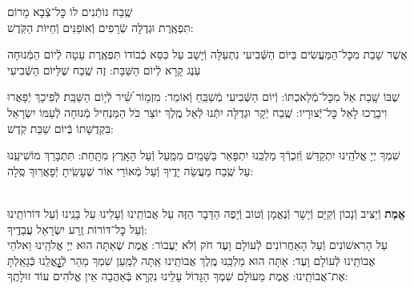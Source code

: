 \documentclass[twoside, openany, parskip=half, 11pt]{book}
\begin{document}
\shatz שֶֽׁבַח נוֹתְֿנִים לוֹ כׇּל־צְֿבָא מָרוֹם \\
תִּפְאֶֽרֶת וּגְדֻלָּה שְֿׂרָפִים וְֿאוֹפַנִּים וְֿחַיּוֹת הַקֹּֽדֶשׁ:

\chazzan {}
 אֲשֶׁר שָׁבַת מִכׇּל־הַמַּעֲשִׂים בַּיּוֹם הַשְּֿׁבִיעִי נִתְעַלָּה וְֿיָשַׁב עַל כִּסֵּא כְֿבוֹדוֹ תִּפְאֶֽרֶת עָטָה לְֿיוֹם הַמְּֿנוּחָה עֹֽנֶג קָרָא לְֿיוֹם הַשַּׁבָּת: זֶה שֶֽׁבַח שֶׁלַּיּוֹם הַשְּֿׁבִיעִי

\kahal
 שֶׁבּוֹ שָֽׁבַת אֵל מִכׇּל־מְֿלַאכְתּוֹ: וְֿיוֹם הַשְּֿׁבִיעִי מְֿשַׁבֵּֽחַ וְֿאוֹמֵר:
%
 מִזְמ֥וֹר שִׁ֝֗יר לְֿי֥וֹם הַשַּׁבָּֽת׃ לְֿפִיכָךְ יְֿפָאֲרוּ וִיבָרֲכוּ לָאֵל כׇּל־יְֿצוּרָיו: שֶֽׁבַח יְֿקָר וּגְדֻלָּה יִתְּֿנוּ לְֿאֵל מֶֽלֶךְ יוֹצֵר כֹּל הַמַּנְחִיל מְֿנוּחָה לְֿעַמּוֹ יִשְׂרָאֵל בִּקְדֻשָּׁתוֹ בְּֿיוֹם שַׁבַּת קֹֽדֶשׁ:

 \chazzan
 שִׁמְךָ יְיָ אֱלֹהֵֽינוּ יִתְקַדַּשׁ וְֿזִכְרְֿךָ מַלְכֵּֽנוּ יִתְפָּאַר בַּשָּׁמַֽיִם מִמַּֽעַל וְֿעַל הָאָֽרֶץ מִתָּֽחַת:
 תִּתְבָּרַךְ מוֹשִׁיעֵֽנוּ עַל שֶֽׁבַח מַעֲשֵׂה יָדֶֽיךָ וְֿעַל מְֿאוֹרֵי אוֹר שֶׁעָשִֽׂיתָ יְֿפָאֲרֽוּךָ סֶּֽלָה:


\label{tisbarach}
\yotzerhameoros

\ahavaraba

\shema

\veahavta

\vehaya

\vayomer{}

 \smallskip

\begin{paracol}{2}
\\
\textbf{
אֱמֶת
}
 וְֿיַצִּיב וְֿנָכוֹן וְֿקַיָּם וְֿיָשָׁר וְֿנֶאֱמָן וְֿטוֹב וְֿיָפֶה הַדָּבָר הַזֶּה עַל אֲבוֹתֵֽינוּ וְֿעָלֵינוּ עַל בָּנֵֽינוּ וְֿעַל דּוֹרוֹתֵֽינוּ וְֿעַל כׇּל־דּוֹרוֹת זֶֽרַע יִשְׂרָאֵל עֲבָדֶֽיךָ:\\
 עַל הָרִאשׁוֹנִים וְֿעַל הָאַחֲרוֹנִים לְֿעוֹלָם וָעֶד חֹק וְֿלֹא יַעֲבוֹר: אֱמֶת שֶׁאַתָּה הוּא יְיָ אֱלֹהֵֽינוּ וֵאלֹהֵי אֲבוֹתֵֽינוּ לְֿעוֹלָם וָעֶד: אַתָּה הוּא מַלְכֵּֽנוּ מֶֽלֶךְ אֲבוֹתֵֽינוּ אַֽתָּה לְֿמַֽעַן שִׁמְךָ מַהֵר לְֿגׇׇׇׇׇׇׇׇׇׇׇׇָאֳלֵֽנוּ כְּֿגָאַֽלְתָּ אֶת־אֲבוֹתֵֽינוּ: אֱמֶת מֵעוֹלָם שִׁמְךָ הַגָּדוֹל עָלֵֽינוּ נִקְרָא בְּֿאַהֲבָה אֵין אֱלֹהִים עוֹד זוּלָתֶֽךָ:

\switchcolumn

\emesveyatziv

\end{paracol}

\ezrasavoseinu

\clearpage

\gaalyisroel
\end{document}
